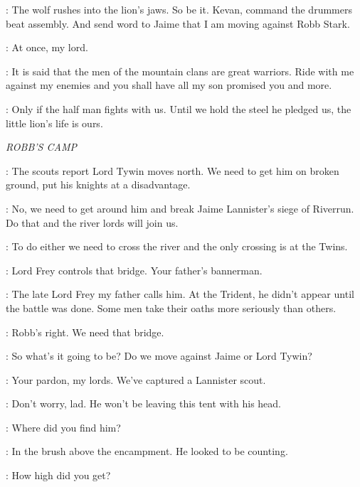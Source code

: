 \TYWIN: The wolf rushes into the lion's jaws. So be it. Kevan, command the drummers beat assembly.  And send word to Jaime that I am moving against Robb Stark. 

\PAGE: At once, my lord. 

\TYWIN:  It is said that the men of the mountain clans are great warriors. Ride with me against my enemies and you shall have all my son promised you and more. 

\SHAGGA: Only if the half man fights with us. Until we hold the steel he pledged us, the little lion's life is ours. 


\scene

\textit{ROBB'S CAMP} 


\RODRIK: The scouts report Lord Tywin moves north. We need to get him on broken ground, put his knights at a disadvantage. 

\UMBER: No, we need to get around him and break Jaime Lannister's siege of Riverrun. Do that and the river lords will join us. 

\ROBB: To do either we need to cross the river and the only crossing is at the Twins. 

\THEON: Lord Frey controls that bridge. Your father's bannerman. 

\CATELYN: The late Lord Frey my father calls him. At the Trident, he didn't appear until the battle was done. Some men take their oaths more seriously than others. 

\THEON: Robb's right. We need that bridge. 

\UMBER: So what's it going to be? Do we move against Jaime or Lord Tywin? 


\STARKGUARD: Your pardon, my lords. We've captured a Lannister scout. 


\UMBER: Don't worry, lad. He won't be leaving this tent with his head. 

\ROBB: Where did you find him? 

\STARKGUARD: In the brush above the encampment. He looked to be counting. 

\ROBB:  How high did you get? 

